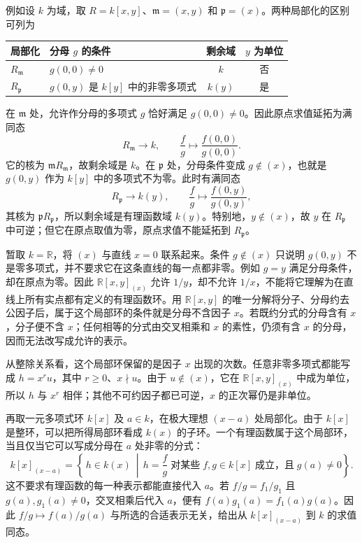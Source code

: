 \ProseParagraphBreak
例如设 \(k\) 为域，取 \(R=k[x,y]\)、\(\mathfrak m=(x,y)\) 和 \(\mathfrak p=(x)\)。两种局部化的区别可列为
\begin{center}
	\begin{tabularx}{\linewidth}{@{}lXcc@{}}
		\toprule
		局部化 & 分母 \(g\) 的条件 & 剩余域 & \(y\) 为单位 \\
		\midrule
		\(R_{\mathfrak m}\) & \(g(0,0)\ne0\) & \(k\) & 否 \\
		\(R_{\mathfrak p}\) & \(g(0,y)\) 是 \(k[y]\) 中的非零多项式 & \(k(y)\) & 是 \\
		\bottomrule
	\end{tabularx}
\end{center}
在 \(\mathfrak m\) 处，允许作分母的多项式 \(g\) 恰好满足 \(g(0,0)\neq0\)。因此原点求值延拓为满同态
\[
	R_{\mathfrak m}\longrightarrow k,\qquad \frac fg\longmapsto\frac{f(0,0)}{g(0,0)}.
\]
它的核为 \(\mathfrak mR_{\mathfrak m}\)，故剩余域是 \(k\)。在 \(\mathfrak p\) 处，分母条件变成 \(g\notin(x)\)，也就是 \(g(0,y)\) 作为 \(k[y]\) 中的多项式不为零。此时有满同态
\[
	R_{\mathfrak p}\longrightarrow k(y),\qquad \frac fg\longmapsto\frac{f(0,y)}{g(0,y)},
\]
其核为 \(\mathfrak pR_{\mathfrak p}\)，所以剩余域是有理函数域 \(k(y)\)。特别地，\(y\notin(x)\)，故 \(y\) 在 \(R_{\mathfrak p}\) 中可逆；但它在原点取值为零，原点求值不能延拓到 \(R_{\mathfrak p}\)。

\ProseParagraphBreak
暂取 \(k=\mathbb R\)，将 \((x)\) 与直线 \(x=0\) 联系起来。条件 \(g\notin(x)\) 只说明 \(g(0,y)\) 不是零多项式，并不要求它在这条直线的每一点都非零。例如 \(g=y\) 满足分母条件，却在原点为零。因此 \(\mathbb R[x,y]_{(x)}\) 允许 \(1/y\)，却不允许 \(1/x\)，不能将它理解为在直线上所有实点都有定义的有理函数环。用 \(\mathbb R[x,y]\) 的唯一分解将分子、分母约去公因子后，属于这个局部环的条件就是分母不含因子 \(x\)。若既约分式的分母含有 \(x\)，分子便不含 \(x\)；任何相等的分式由交叉相乘和 \(x\) 的素性，仍须有含 \(x\) 的分母，因而无法改写成允许的表示。

\ProseParagraphBreak
从整除关系看，这个局部环保留的是因子 \(x\) 出现的次数。任意非零多项式都能写成 \(h=x^ru\)，其中 \(r\ge0\)、\(x\nmid u\)。由于 \(u\notin(x)\)，它在 \(\mathbb R[x,y]_{(x)}\) 中成为单位，所以 \(h\) 与 \(x^r\) 相伴；其他不可约因子都已可逆，\(x\) 的正次幂仍是非单位。

\ProseParagraphBreak
再取一元多项式环 \(k[x]\) 及 \(a\in k\)，在极大理想 \((x-a)\) 处局部化。由于 \(k[x]\) 是整环，可以把所得局部环看成 \(k(x)\) 的子环。一个有理函数属于这个局部环，当且仅当它可以写成分母在 \(a\) 处非零的分式：
\[
	k[x]_{(x-a)} =\left\{\,h\in k(x)\ \middle|\, h=\frac fg\;\text{对某些}\;f,g\in k[x]\;\text{成立，且}\;g(a)\neq0 \right\}.
\]
这不要求有理函数的每一种表示都能直接代入 \(a\)。若 \(f/g=f_1/g_1\) 且 \(g(a),g_1(a)\neq0\)，交叉相乘后代入 \(a\)，便有 \(f(a)g_1(a)=f_1(a)g(a)\)。因此 \(f/g\mapsto f(a)/g(a)\) 与所选的合适表示无关，给出从 \(k[x]_{(x-a)}\) 到 \(k\) 的求值同态。

